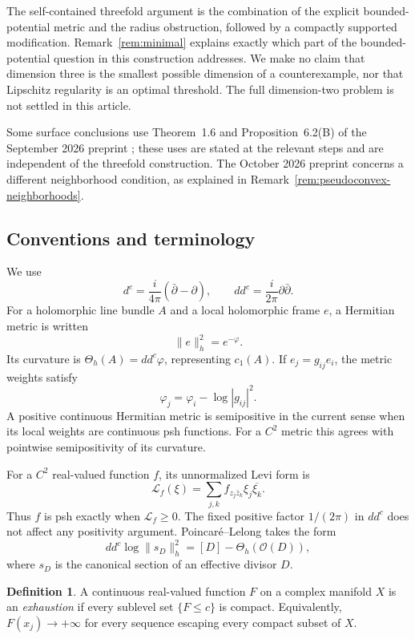 \documentclass[11pt]{amsart}
\theoremstyle{definition}
\newtheorem{definition}[theorem]{Definition}
\theoremstyle{remark}
\numberwithin{equation}{section}
\newcommand{\OO}{\mathcal O}
\newcommand{\ddc}{dd^c}
\newcommand{\Levi}{\mathcal L}
\newcommand{\barp}{\bar\partial}
\begin{document}
The self-contained threefold argument is the combination of the
explicit bounded-potential metric and the radius obstruction, followed
by a compactly supported modification. Remark~\ref{rem:minimal}
explains exactly which part of the bounded-potential question in
\cite[Section~4]{Zhang2025} this construction addresses. We make no
claim that dimension three is the smallest possible dimension of a
counterexample, nor that Lipschitz regularity is an optimal threshold.
The full dimension-two problem is not settled in this article.

Some surface conclusions use Theorem~1.6 and Proposition~6.2(B) of the
September 2026 preprint \cite{CFSTZ2026}; these uses are stated at the
relevant steps and are independent of the threefold construction.
The October 2026 preprint \cite{KoikeTakakura2026} concerns a different
neighborhood condition, as explained in
Remark~\ref{rem:pseudoconvex-neighborhoods}.

\subsection{Conventions and terminology}\label{sec:conventions}

We use
\[
 d^c=\frac{i}{4\pi}(\barp-\partial),\qquad
 \ddc=\frac{i}{2\pi}\partial\barp.
\]
For a holomorphic line bundle $A$ and a local holomorphic frame $e$, a
Hermitian metric is written
\[
 \|e\|_h^2=e^{-\varphi}.
\]
Its curvature is $\Theta_h(A)=\ddc\varphi$, representing $c_1(A)$.
If $e_j=g_{ij}e_i$, the metric weights satisfy
\begin{equation}\label{eq:metric-transition}
 \varphi_j=\varphi_i-\log|g_{ij}|^2.
\end{equation}
A positive continuous Hermitian metric is semipositive in the current
sense when its local weights are continuous psh functions. For a $C^2$
metric this agrees with pointwise semipositivity of its curvature.

For a $C^2$ real-valued function $f$, its unnormalized Levi form is
\[
 \Levi_f(\xi)=\sum_{j,k}f_{z_j\bar z_k}\xi_j\overline{\xi_k}.
\]
Thus $f$ is psh exactly when $\Levi_f\ge0$. The fixed positive factor
$1/(2\pi)$ in $\ddc$ does not affect any positivity argument.
Poincar\'e--Lelong takes the form
\begin{equation}\label{eq:PL}
 \ddc\log\|s_D\|_h^2=[D]-\Theta_h(\OO(D)),
\end{equation}
where $s_D$ is the canonical section of an effective divisor $D$.

\begin{definition}
A continuous real-valued function $F$ on a complex manifold $X$ is an
\emph{exhaustion} if every sublevel set $\{F\le c\}$ is compact.
Equivalently, $F(x_j)\to+\infty$ for every sequence escaping every
compact subset of $X$.
\end{definition}
\end{document}
